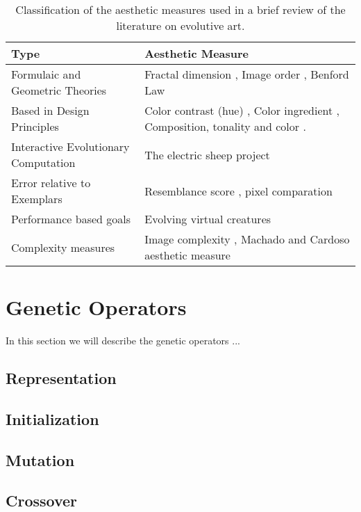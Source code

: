 \documentclass[conference]{IEEEtran}
\begin{document}
\begin{table*}[!t] 
\renewcommand{\arraystretch}{1.3} 
\caption{Classification of the aesthetic measures used in a brief review of the literature on evolutive art.} 
\label{table_class} 
\centering
\begin{tabular}{|l|l|}
\hline
Type & Aesthetic Measure \\ \hline
Formulaic and Geometric Theories & Fractal dimension \cite{den2010comparing}, Image order \cite{li2012investigating}, Benford Law \cite{del2005benford}\\ \hline
Based in Design Principles &  Color contrast (hue) \cite{den2012evolving},  Color ingredient \cite{li2012investigating}, Composition, tonality and color \cite{dipaola2009incorporating}.\\ \hline
Interactive Evolutionary Computation & The electric sheep project \cite{draves2006electric} \\ \hline
Error relative to Exemplars &  Resemblance score \cite{dipaola2009incorporating}, pixel comparation \cite{aguilar2008robotic}\\ \hline
Performance based goals & Evolving virtual creatures \cite{sims1994evolving} \\\hline
Complexity measures & Image complexity \cite{li2012investigating}, Machado and Cardoso aesthetic measure \cite{machado1998computing}\\ \hline
\end{tabular}
\end{table*}

\section{Genetic Operators}\label{go}
In this section we will describe the genetic operators ...
\subsection{Representation}\label{go:repre}
\subsection{Initialization}\label{go:init}
\subsection{Mutation}\label{go:mutation}
\subsection{Crossover}\label{go:crossover}
\end{document}
